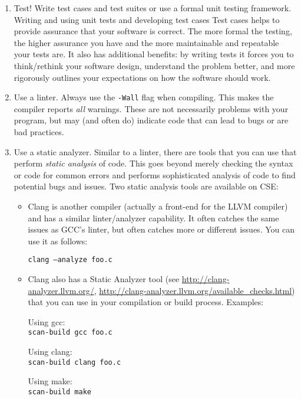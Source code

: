 \documentclass[12pt]{scrartcl}
\begin{document}
\begin{enumerate}
  \item Test!  Write test cases and test suites or use a formal
  unit testing framework.  Writing and using unit tests and developing
  test cases Test cases helps to provide assurance that your
  software is correct.  The more formal the testing, the higher assurance
  you have and the more maintainable and repeatable your tests are.
  It also has additional benefits: by writing tests it forces you to
  think/rethink your software design, understand the problem better, and
  more rigorously outlines your expectations on how the software should
  work.
  
  \item Use a linter.  Always use the \texttt{-Wall} flag 
  when compiling.  This makes the compiler reports \emph{all} warnings.
  These are not necessarily problems with your program, but may (and often
  do) indicate code that can lead to bugs or are bad practices.  

  \item Use a static analyzer.  Similar to a linter, there are tools that
  you can use that perform \emph{static analysis} of code.  This goes
  beyond merely checking the syntax or code for common errors and performs
  sophisticated analysis of code to find potential bugs and issues.  Two
  static analysis tools are available on CSE:
  \begin{itemize}
    \item Clang is another compiler (actually a front-end for the LLVM 
    compiler) and has a similar linter/analyzer capability.  It often
    catches the same issues as GCC's linter, but often catches more
    or different issues.  You can use it as follows:
    
    \texttt{clang --analyze foo.c}
    
    \item Clang also has a Static Analyzer tool (see 
    \url{http://clang-analyzer.llvm.org/}, 
    \url{http://clang-analyzer.llvm.org/available_checks.html})
    that you can use in your compilation or build process.  
    Examples:
    
    Using gcc: \\
    \texttt{scan-build gcc foo.c}
    
    Using clang: \\
    \texttt{scan-build clang foo.c}

    Using make: \\
    \texttt{scan-build make}


\end{itemize}
\end{enumerate}
\end{document}
